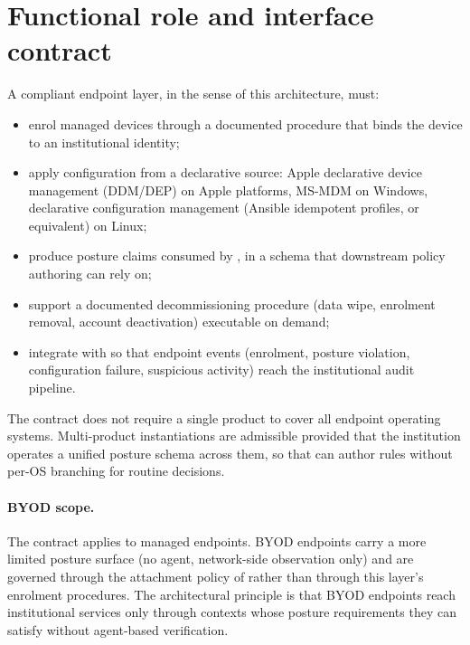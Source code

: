 \section{Functional role and interface contract}
\label{sec:ep-contract}

\begin{contractbox}
\noindent A compliant endpoint layer, in the sense of this
architecture, must:

\begin{itemize}[leftmargin=1.5em,nosep]
  \item enrol managed devices through a documented procedure that
    binds the device to an institutional identity;
  \item apply configuration from a declarative source: Apple
    declarative device management (DDM/DEP) on Apple platforms,
    MS-MDM on Windows, declarative configuration management
    (Ansible idempotent profiles, or equivalent) on Linux;
  \item produce posture claims consumed by , in
    a schema that downstream policy authoring can rely on;
  \item support a documented decommissioning procedure (data wipe,
    enrolment removal, account deactivation) executable on demand;
  \item integrate with  so that
    endpoint events (enrolment, posture violation, configuration
    failure, suspicious activity) reach the institutional audit
    pipeline.
\end{itemize}

\noindent The contract does not require a single product to cover all
endpoint operating systems. Multi-product instantiations are
admissible provided that the institution operates a unified posture
schema across them, so that  can author rules
without per-OS branching for routine decisions.
\end{contractbox}

\paragraph{BYOD scope.} The contract applies to managed endpoints.
BYOD endpoints carry a more limited posture surface (no agent,
network-side observation only) and are governed through the
attachment policy of  rather than through this
layer's enrolment procedures. The architectural principle is that
BYOD endpoints reach institutional services only through
contexts whose posture requirements they can satisfy without
agent-based verification.

